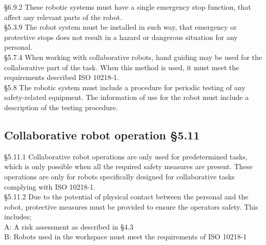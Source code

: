 \S6.9.2 These robotic systems must have a single emergency stop function, that affect any relevant parts of the robot.\\

\S5.3.9 The robot system must be installed in such way, that emergency or protective stops does not result in a hazard or dangerous situation for any personal.\\

\S5.7.4 When working with collaborative robots, hand guiding may be used for the collaborative part of the task. When this method is used, it must meet the requirements described ISO 10218-1.\\

\S5.8 The robotic system must include a procedure for periodic testing of any safety-related equipment. The information of use for the robot must include a description of the testing procedure. \\

\subsection{Collaborative robot operation \S5.11}

\S5.11.1 Collaborative robot operations are only used for predetermined tasks, which is only possible when all the required safety measures are present. These operations are only for robots specifically designed for collaborative tasks complying with ISO 10218-1. \\

\S5.11.2 Due to the potential of physical contact between the personal and the robot, protective measures must be provided to ensure the operators safety. This includes; \\
A: A risk assessment as described in \S4.3\\
B: Robots used in the workspace must meet the requirements of ISO 10218-1 \\
\cite{ISO10218-2}


